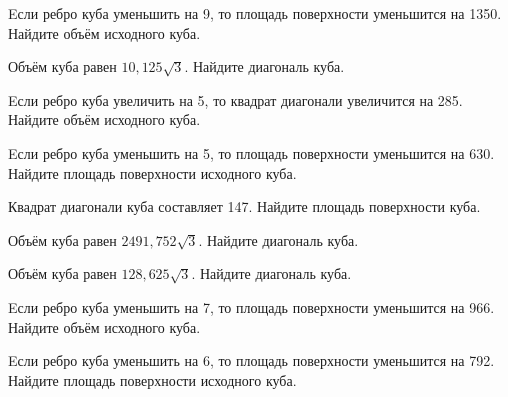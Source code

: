 \begin{taskBN}{56}
Eсли ребро куба уменьшить на 9, то площадь поверхности уменьшится на 1350. Найдите объём исходного куба.
\end{taskBN}

\begin{taskBN}{57}
Объём куба равен $10,125\sqrt{3}$. Найдите диагональ куба.
\end{taskBN}

\begin{taskBN}{58}
Eсли ребро куба увеличить на 5, то квадрат диагонали увеличится на 285. Найдите объём исходного куба.
\end{taskBN}

\begin{taskBN}{59}
Eсли ребро куба уменьшить на 5, то площадь поверхности уменьшится на 630. Найдите площадь поверхности исходного куба.
\end{taskBN}

\begin{taskBN}{60}
Квадрат диагонали куба составляет 147. Найдите площадь поверхности куба.
\end{taskBN}

\begin{taskBN}{61}
Объём куба равен $2491,752\sqrt{3}$. Найдите диагональ куба.
\end{taskBN}

\begin{taskBN}{62}
Объём куба равен $128,625\sqrt{3}$. Найдите диагональ куба.
\end{taskBN}

\begin{taskBN}{63}
Eсли ребро куба уменьшить на 7, то площадь поверхности уменьшится на 966. Найдите объём исходного куба.
\end{taskBN}

\begin{taskBN}{64}
Eсли ребро куба уменьшить на 6, то площадь поверхности уменьшится на 792. Найдите площадь поверхности исходного куба.
\end{taskBN}

